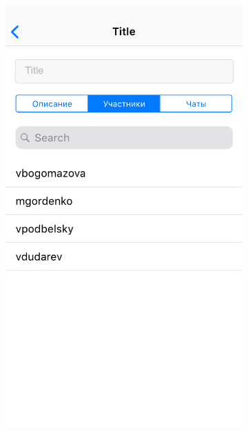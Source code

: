 \documentclass[a4paper,12pt,reqno]{article}
\begin{document}
\begin{figure}[h!]
		\begin{subfigure}[b]{0.3\linewidth}
			\includegraphics[width=\linewidth]{../includes/prototype/6.pdf}
		\end{subfigure}
		\begin{subfigure}[b]{0.3\linewidth}

\end{subfigure}
\end{figure}
\end{document}
